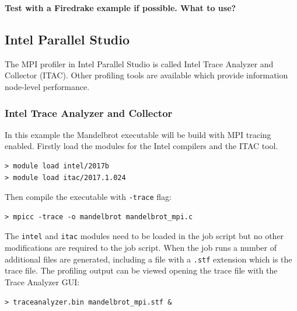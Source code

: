 \documentclass[a4paper,titlepage]{article}
\begin{document}
\textbf{Test with a Firedrake example if possible. What to use?}


\subsection{Intel Parallel Studio}

The MPI profiler in Intel Parallel Studio is called Intel Trace Analyzer and Collector (ITAC). Other profiling tools are available which provide information node-level performance.

\subsubsection{Intel Trace Analyzer and Collector}

In this example the Mandelbrot executable will be build with MPI tracing enabled. Firstly load the modules for the Intel compilers and the ITAC tool. 
\begin{verbatim}
> module load intel/2017b
> module load itac/2017.1.024
\end{verbatim}
Then compile the executable with \texttt{-trace} flag:
\begin{verbatim}
> mpicc -trace -o mandelbrot mandelbrot_mpi.c
\end{verbatim}
The \texttt{intel} and \texttt{itac} modules need to be loaded in the job script but no other modifications are required to the job script. When the job runs a number of additional files are generated, including a file with a \texttt{.stf} extension which is the trace file.
The profiling output can be viewed opening the trace file with the Trace Analyzer GUI:
\begin{verbatim}
> traceanalyzer.bin mandelbrot_mpi.stf &
\end{verbatim}
\end{document}
